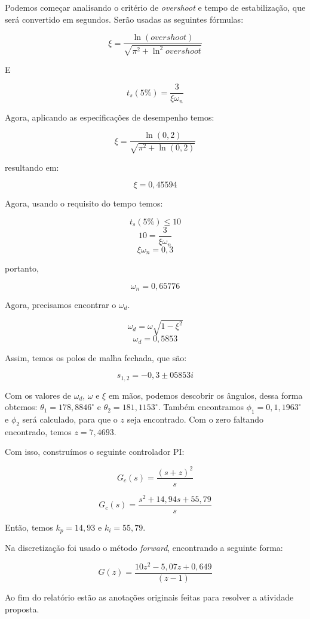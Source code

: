 \documentclass[
	12pt,				%
	openany,			%
	oneside,			%
	a4paper,			%
	english,			%
	french,				%
	spanish,			%
	brazil,				%
	]{abntex2}
\begin{document}
{Podemos começar analisando o critério de \textit{overshoot} e tempo de estabilização, que será convertido em segundos. Serão usadas as seguintes fórmulas:

\begin{equation}
	\xi = \frac{\ln(overshoot)}{\sqrt{\pi^2+\ln^2overshoot}}
\end{equation}

E

\begin{equation}
	t_s(5\%) = \frac{3}{\xi\omega_n}
\end{equation}

Agora, aplicando as especificações de desempenho temos:

$$\xi = \frac{\ln(0,2)}{\sqrt{\pi^2 + \ln(0,2)}}$$

resultando em:

$$\xi = 0,45594$$

Agora, usando o requisito do tempo temos:

$$t_s(5\%) \leq 10 $$
$$10 = \frac{3}{\xi\omega_n}$$
$${\xi\omega_n} = 0,3$$

portanto, 

$$\omega_n = 0,65776$$

Agora, precisamos encontrar o $\omega_d$.

$$\omega_d = \omega \sqrt{1-\xi^2}$$
$$\omega_d = 0,5853$$

Assim, temos os polos de malha fechada, que são:

$$s_{1,2} = -0,3 \pm 05853i$$

Com os valores de $\omega_d$, $\omega$ e $\xi$ em mãos, podemos descobrir os ângulos, dessa forma obtemos: $\theta_1 = 178,8846 ^ {\circ}$ e $\theta_2 = 181,1153^{\circ}$. Também encontramos $\phi_1 = 0,1,1963^{\circ}$ e $\phi_2$ será calculado, para que o $z$ seja encontrado. Com o zero faltando encontrado, temos $z = 7,4693$. 

Com isso, construímos o seguinte controlador PI:

$$G_c(s) = \frac{(s+z)^2}{s}$$ 

$$G_c(s) = \frac{s^2 + 14,94s + 55,79}{s}$$

Então, temos $k_p = 14,93$ e $k_i = 55,79$.

Na discretização foi usado o método \textit{forward}, encontrando a seguinte forma:

$$G(z) = \frac{10z^2 - 5,07z + 0,649}{(z-1)}$$

Ao fim do relatório estão as anotações originais feitas para resolver a atividade proposta.

}
\end{document}
